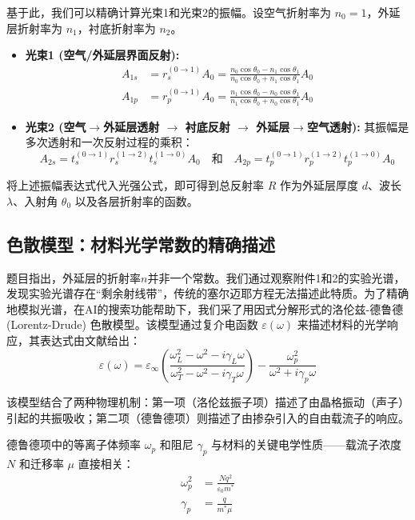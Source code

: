 \documentclass[a4paper]{ctexart}
\begin{document}
基于此，我们可以精确计算光束1和光束2的振幅。设空气折射率为 $n_0=1$，外延层折射率为 $n_1$，衬底折射率为 $n_2$。
\begin{itemize}
    \item \textbf{光束1 (空气/外延层界面反射):}
    \begin{align}
        A_{1s} &= r_s^{(0\to 1)} A_0 = \frac{n_0 \cos\theta_0 - n_1 \cos\theta_1}{n_0 \cos\theta_0 + n_1 \cos\theta_1} A_0 \\
        A_{1p} &= r_p^{(0\to 1)} A_0 = \frac{n_1 \cos\theta_0 - n_0 \cos\theta_1}{n_1 \cos\theta_0 + n_0 \cos\theta_1} A_0
    \end{align}
    \item \textbf{光束2 (空气$\to$外延层透射 $\to$ 衬底反射 $\to$ 外延层$\to$空气透射):}
    其振幅是多次透射和一次反射过程的乘积：
    \begin{equation}
        A_{2s} = t_s^{(0\to 1)} r_s^{(1\to 2)} t_s^{(1\to 0)} A_0 \quad \text{和} \quad A_{2p} = t_p^{(0\to 1)} r_p^{(1\to 2)} t_p^{(1\to 0)} A_0
    \end{equation}
\end{itemize}
将上述振幅表达式代入光强公式，即可得到总反射率 $R$ 作为外延层厚度 $d$、波长 $\lambda$、入射角 $\theta_0$ 以及各层折射率的函数。

\subsection{色散模型：材料光学常数的精确描述}
题目指出，外延层的折射率$n$并非一个常数。我们通过观察附件1和2的实验光谱，发现实验光谱存在“剩余射线带”，传统的塞尔迈耶方程无法描述此特质。为了精确地模拟光谱，在AI\cite{ai:gemini}的搜索功能帮助下，我们采了用因式分解形式的洛伦兹-德鲁德(Lorentz-Drude) 色散模型。该模型通过复介电函数 $\varepsilon(\omega)$ 来描述材料的光学响应，其表达式由文献\cite{oishi2006simultaneous}给出：
\begin{equation}
\varepsilon(\omega) = \varepsilon_{\infty} \left( \frac{\omega_L^2 - \omega^2 - i\gamma_L\omega}{\omega_T^2 - \omega^2 - i\gamma_T\omega} \right) - \frac{\omega_p^2}{\omega^2 + i\gamma_p\omega}
\label{eq:lorentz_drude}
\end{equation}

该模型结合了两种物理机制：第一项（洛伦兹振子项）描述了由晶格振动（声子）引起的共振吸收；第二项（德鲁德项）则描述了由掺杂引入的自由载流子的响应。

德鲁德项中的等离子体频率 $\omega_p$ 和阻尼 $\gamma_p$ 与材料的关键电学性质——载流子浓度 $N$ 和迁移率 $\mu$ 直接相关：
\begin{align}
    \omega_p^2 &= \frac{Nq^2}{\varepsilon_0 m^*} \label{eq:plasma_freq} \\
    \gamma_p &= \frac{q}{m^*\mu} \label{eq:damping_rate}
\end{align}
\end{document}
